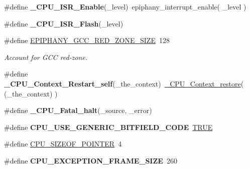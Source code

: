 \begin{DoxyCompactItemize}
\item 
\mbox{\label{group__RTEMSScoreCPUEpiphany_ga01f5da058924ecbc4c84ceb8613145a0}} 
\#define {\bfseries \+\_\+\+C\+P\+U\+\_\+\+I\+S\+R\+\_\+\+Enable}(\+\_\+level)~epiphany\+\_\+interrupt\+\_\+enable( \+\_\+level )
\item 
\#define {\bfseries \+\_\+\+C\+P\+U\+\_\+\+I\+S\+R\+\_\+\+Flash}(\+\_\+level)
\item 
\#define \mbox{\hyperlink{group__RTEMSScoreCPUEpiphany_gab05e3ce1be5f55e589601371695e6979}{E\+P\+I\+P\+H\+A\+N\+Y\+\_\+\+G\+C\+C\+\_\+\+R\+E\+D\+\_\+\+Z\+O\+N\+E\+\_\+\+S\+I\+ZE}}~128
\begin{DoxyCompactList}\small\item\em Account for G\+CC red-\/zone. \end{DoxyCompactList}\item 
\mbox{\label{group__RTEMSScoreCPUEpiphany_ga3fb67e174d7b61251322cd32126acd1a}} 
\#define {\bfseries \+\_\+\+C\+P\+U\+\_\+\+Context\+\_\+\+Restart\+\_\+self}(\+\_\+the\+\_\+context)~\mbox{\hyperlink{group__RTEMSScoreCPUARM_ga80726ebfe00f31a88b086cc4474c472f}{\+\_\+\+C\+P\+U\+\_\+\+Context\+\_\+restore}}( (\+\_\+the\+\_\+context) )
\item 
\#define {\bfseries \+\_\+\+C\+P\+U\+\_\+\+Fatal\+\_\+halt}(\+\_\+source,  \+\_\+error)
\item 
\mbox{\label{group__RTEMSScoreCPUEpiphany_gab0aff7a561b9c030a4d88eff201f4688}} 
\#define {\bfseries C\+P\+U\+\_\+\+U\+S\+E\+\_\+\+G\+E\+N\+E\+R\+I\+C\+\_\+\+B\+I\+T\+F\+I\+E\+L\+D\+\_\+\+C\+O\+DE}~\mbox{\hyperlink{group__RTEMSScoreBaseDefs_gaa8cecfc5c5c054d2875c03e77b7be15d}{T\+R\+UE}}
\item 
\#define \mbox{\hyperlink{group__RTEMSScoreCPUEpiphany_gaea4bd2905092d69bc92fbff6103ced8b}{C\+P\+U\+\_\+\+S\+I\+Z\+E\+O\+F\+\_\+\+P\+O\+I\+N\+T\+ER}}~4
\item 
\mbox{\label{group__RTEMSScoreCPUEpiphany_ga6deedaed6077a244b8fa6354da47e6e3}} 
\#define {\bfseries C\+P\+U\+\_\+\+E\+X\+C\+E\+P\+T\+I\+O\+N\+\_\+\+F\+R\+A\+M\+E\+\_\+\+S\+I\+ZE}~260
\item 
\mbox{\label{group__RTEMSScoreCPUEpiphany_gadea68a7fa02909edcebee08748f94223}} 

\end{DoxyCompactItemize}

